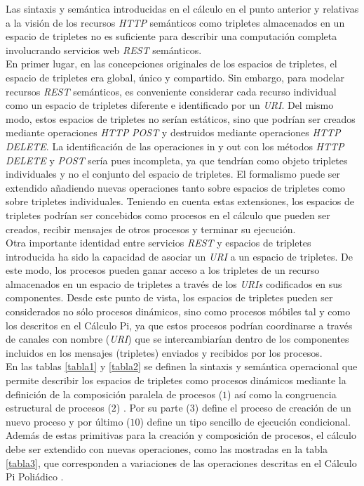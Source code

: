 Las sintaxis y sem\'antica introducidas en el c\'alculo en el punto anterior y relativas a la visi\'on de los recursos \textit{HTTP} sem\'anticos como tripletes almacenados en un espacio de tripletes no es suficiente para describir una computaci\'on completa involucrando servicios web \textit{REST} sem\'anticos.\\
En primer lugar, en las concepciones originales de los espacios de tripletes, el espacio de tripletes era global, \'unico y compartido. Sin embargo, para modelar recursos \textit{REST} sem\'anticos, es conveniente considerar cada recurso individual como un espacio de tripletes diferente e identificado por un \textit{URI}. Del mismo modo, estos espacios de tripletes no ser\'ian est\'aticos, sino que podr\'ian ser creados mediante operaciones \textit{HTTP} \textit{POST} y destruidos mediante operaciones \textit{HTTP} \textit{DELETE}. La identificaci\'on de las operaciones in y out con los m\'etodos \textit{HTTP} \textit{DELETE} y \textit{POST} ser\'ia pues incompleta, ya que tendr\'ian como objeto tripletes individuales y no el conjunto del espacio de tripletes. El formalismo puede ser extendido \cite{simperl2007coordination} a\~nadiendo nuevas operaciones tanto sobre espacios de tripletes como sobre tripletes individuales. Teniendo en cuenta estas extensiones, los espacios de tripletes podr\'ian ser concebidos como procesos en el c\'alculo que pueden ser creados, recibir mensajes de otros procesos y terminar su ejecuci\'on.\\
Otra importante identidad entre servicios \textit{REST} y espacios de tripletes introducida ha sido la capacidad de asociar un \textit{URI} a un espacio de tripletes. De este modo, los procesos pueden ganar acceso a los tripletes de un recurso almacenados en un espacio de tripletes a trav\'es de los \textit{URIs} codificados en sus componentes. Desde este punto de vista, los espacios de tripletes pueden ser considerados no s\'olo procesos din\'amicos, sino como procesos m\'obiles tal y como los descritos en el C\'alculo Pi, ya que estos procesos podr\'ian coordinarse a trav\'es de canales con nombre (\textit{URI}) que se intercambiar\'ian dentro de los componentes incluidos en los mensajes (tripletes) enviados y recibidos por los procesos.\\
En las tablas \ref{tabla1} y \ref{tabla2} se definen la sintaxis y sem\'antica operacional que permite describir los espacios de tripletes como procesos din\'amicos mediante la definici\'on de la composici\'on paralela de procesos ($1$) as\'i como la congruencia estructural de procesos ($2$) \cite{pi_calculus}. Por su parte ($3$) define el proceso de creaci\'on de un nuevo proceso y por \'ultimo ($10$) define un tipo sencillo de ejecuci\'on condicional.\\
Adem\'as de estas primitivas para la creaci\'on y composici\'on de procesos, el c\'alculo debe ser extendido con nuevas operaciones, como las mostradas en la tabla \ref{tabla3}, que corresponden a variaciones de las operaciones descritas en el C\'alculo Pi Poli\'adico \cite{polyadic_pi}.\\

